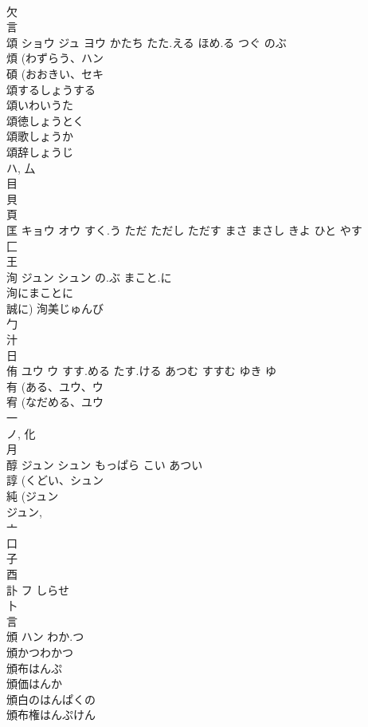 \documentclass[8pt]{extreport}
\begin{document}
\begin{CJK}{UTF8}{min}
\\	欠 
\\	言 
\\	頌	ショウ ジュ ヨウ	かたち たた.える ほめ.る つぐ のぶ	
\\	煩 (わずらう、ハン 
\\	碩 (おおきい、セキ 
\\	頌するしょうする 
\\	頌いわいうた 
\\	頌徳しょうとく 
\\	頌歌しょうか 
\\	頌辞しょうじ 
\\	ハ, 厶 
\\	目 
\\	貝 
\\	頁 
\\	匡	キョウ オウ	すく.う ただ ただし ただす まさ まさし きよ ひと やす	
\\	匚 
\\	王 
\\	洵	ジュン シュン	の.ぶ まこと.に	
\\	洵にまことに 
\\	誠に) 洵美じゅんび 
\\	勹 
\\	汁 
\\	日 
\\	侑	ユウ ウ	すす.める たす.ける あつむ すすむ ゆき ゆ	
\\	有 (ある、ユウ、ウ 
\\	宥 (なだめる、ユウ 
\\	一 
\\	ノ, 化 
\\	月 
\\	醇	ジュン シュン	もっぱら こい あつい	
\\	諄 (くどい、シュン 
\\	純 (ジュン 
\\	ジュン, 
\\	亠 
\\	口 
\\	子 
\\	酉 
\\	訃	フ	しらせ	
\\	卜 
\\	言 
\\	頒	ハン	わか.つ	
\\	頒かつわかつ
\\	頒布はんぷ
\\	頒価はんか
\\	頒白のはんぱくの
\\	頒布権はんぷけん

\end{CJK}
\end{document}
